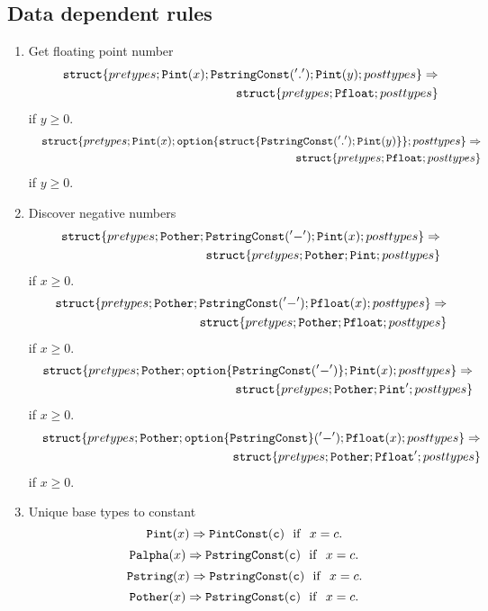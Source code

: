 \documentclass[fleqn]{article}
\newcommand{\struct}[1]{{\tt struct}\{#1\}}
\newcommand{\option}[1]{{\tt option}\{#1\}}
\newcommand{\goto}{\Rightarrow}
\begin{document}
\subsection*{Data dependent rules}
\begin{enumerate}
\item Get floating point number
\begin{eqnarray*}
&& \struct{pretypes; {\tt Pint}(x); {\tt PstringConst ('.')}; {\tt Pint}(y); posttypes} \goto \\
&& \struct{pretypes; {\tt Pfloat}; posttypes}
\end{eqnarray*}
\noindent if $y \ge 0$.
\begin{eqnarray*}
&& \struct{pretypes; {\tt Pint}(x); \option{\struct{{\tt PstringConst ('.')}; {\tt Pint}(y)}}; posttypes} \goto \\
&& \struct{pretypes; {\tt Pfloat}; posttypes}
\end{eqnarray*}
\noindent if $y \ge 0$.

\item Discover negative numbers
\begin{eqnarray*}
&& \struct{pretypes; {\tt Pother}; {\tt PstringConst}('-'); {\tt Pint}(x); posttypes} \goto \\
&& \struct{pretypes; {\tt Pother}; {\tt Pint}; posttypes}
\end{eqnarray*}
\noindent if $x \ge 0$.
\begin{eqnarray*}
&& \struct{pretypes; {\tt Pother}; {\tt PstringConst}('-'); {\tt Pfloat}(x); posttypes} \goto \\
&& \struct{pretypes; {\tt Pother}; {\tt Pfloat}; posttypes}
\end{eqnarray*}
\noindent if $x \ge 0$.
\begin{eqnarray*}
&& \struct{pretypes; {\tt Pother}; \option{{\tt PstringConst}('-')}; {\tt Pint}(x); posttypes} \goto \\
&& \struct{pretypes; {\tt Pother}; {\tt Pint}'; posttypes}
\end{eqnarray*}
\noindent if $x \ge 0$.
\begin{eqnarray*}
&& \struct{pretypes; {\tt Pother}; {\tt \option{PstringConst}('-')}; {\tt Pfloat}(x); posttypes} \goto \\
&& \struct{pretypes; {\tt Pother}; {\tt Pfloat}'; posttypes}
\end{eqnarray*}
\noindent if $x \ge 0$.

\item Unique base types to constant
\[
{\tt Pint}(x) \goto {\tt PintConst(c)}~~ {\rm if}~~ x = c.
\]
\[
{\tt Palpha}(x) \goto {\tt PstringConst(c)}~~ {\rm if}~~ x = c.
\]
\[
{\tt Pstring}(x) \goto {\tt PstringConst(c)}~~ {\rm if}~~ x = c.
\]
\[
{\tt Pother}(x) \goto {\tt PstringConst(c)}~~ {\rm if}~~ x = c.
\]



\end{enumerate}
\end{document}
